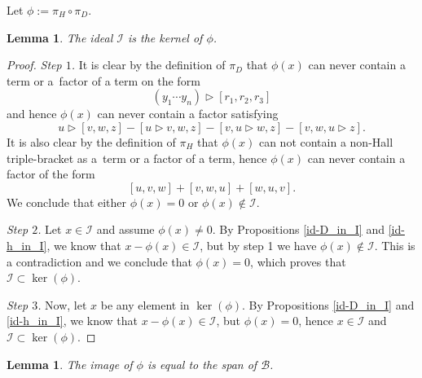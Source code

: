 \documentclass[10pt,a4paper]{amsart}
\newcommand*{\Alg}{\operatorname{Alg}}
\newcommand{\I}{\mathcal{I}}
\numberwithin{equation}{section}
\newtheorem{Lemma}[Theorem]{Lemma}
\begin{document}
Let $\phi := \pi_H \circ \pi_D$.


\begin{Lemma}\label{lemma:ker}
The ideal $\mathcal{I}$ is the kernel of $\phi$.
\end{Lemma}

\begin{proof}
\textit{Step $1$.} It is clear by the definition of $\pi_D$ that $\phi(x)$ can never contain a term or a~factor of a term on the form
\[
(y_1 \cdots y_n) \rhd [r_1, r_2, r_3]
\]
and hence $\phi(x)$ can never contain a factor satisfying
\[
u \rhd [v,w,z] - [u\rhd v ,w,z] - [v, u \rhd w , z] - [v,w,u \rhd z].
\]
It is also clear by the definition of $\pi_H$ that $\phi(x)$ can not contain a non-Hall triple-bracket as a~term or a factor of a term, hence $\phi(x)$ can never contain a factor of the form
\[
[u,v,w] + [v,w,u] + [w,u,v].
\]
We conclude that either $\phi(x)=0$ or $\phi(x) \notin \mathcal{I}$.

\textit{Step $2$.} Let $x \in \mathcal{I}$ and assume $\phi(x) \neq 0$. By Propositions \ref{id-D_in_I} and \ref{id-h_in_I}, we know that $x-\phi(x)\in \mathcal{I}$, but by step 1 we have $\phi(x) \notin \mathcal{I}$. This is a contradiction and we conclude that $\phi(x)=0$, which proves that $\I \subset \ker(\phi)$.

\textit{Step $3$.} Now, let $x$ be any element in $\ker(\phi)$. By Propositions \ref{id-D_in_I} and \ref{id-h_in_I}, we know that $x- \phi(x) \in \I$, but $\phi(x)=0$, hence $x\in \I$ and $\I \subset \ker(\phi)$.
\end{proof}


\begin{Lemma}\label{lemma:Im}
The image of $\phi$ is equal to the span of $\mathcal{B}$.
\end{Lemma}
\end{document}
